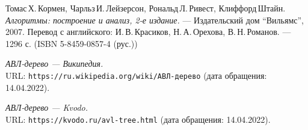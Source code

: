 \begin{thebibliography}{99}

Томас\,Х.\,Кормен, Чарльз\,И.\,Лейзерсон, Рональд\,Л.\,Ривест, Клиффорд\,Штайн.
{\itshape Алгоритмы: построение и анализ, 2-е издание.} --- Издательский дом \enquote{Вильямс}, 2007. Перевод с английского: И.\,В.\,Красиков, Н.\,А.\,Орехова, В.\,Н.\,Романов. --- 1296 с. (ISBN 5-8459-0857-4 (рус.))

{\itshape АВЛ-дерево — Википедия.} \\URL: \texttt{https://ru.wikipedia.org/wiki/АВЛ-дерево} (дата обращения: 14.04.2022).

{\itshape АВЛ-дерево — Kvodo.} \\URL:
\texttt{https://kvodo.ru/avl-tree.html} (дата обращения: 14.04.2022).

\end{thebibliography}
\pagebreak
